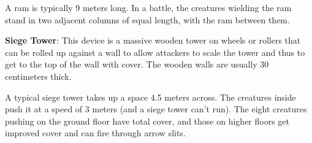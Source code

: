 A ram is typically 9 meters long. In a battle, the creatures wielding the ram stand in two adjacent columns of equal length, with the ram between them.

\textbf{Siege Tower}: This device is a massive wooden tower on wheels or rollers that can be rolled up against a wall to allow attackers to scale the tower and thus to get to the top of the wall with cover. The wooden walls are usually 30 centimeters thick.

A typical siege tower takes up a space 4.5 meters across. The creatures inside push it at a speed of 3 meters (and a siege tower can't run). The eight creatures pushing on the ground floor have total cover, and those on higher floors get improved cover and can fire through arrow slits.

